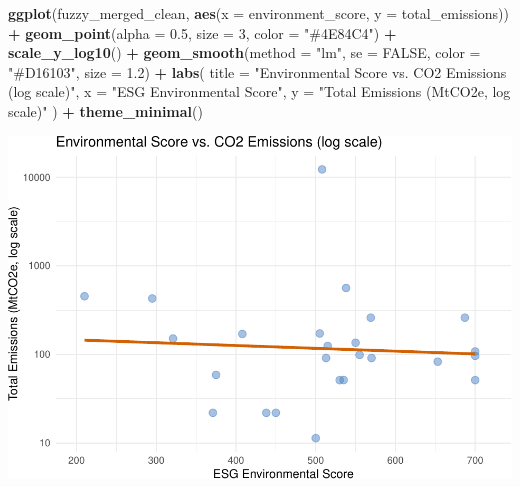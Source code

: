 \documentclass[
]{article}
\newenvironment{Shaded}{\begin{snugshade}}{\end{snugshade}}
\newcommand{\AttributeTok}[1]{\textcolor[rgb]{0.13,0.29,0.53}{#1}}
\newcommand{\ConstantTok}[1]{\textcolor[rgb]{0.56,0.35,0.01}{#1}}
\newcommand{\DecValTok}[1]{\textcolor[rgb]{0.00,0.00,0.81}{#1}}
\newcommand{\FloatTok}[1]{\textcolor[rgb]{0.00,0.00,0.81}{#1}}
\newcommand{\FunctionTok}[1]{\textcolor[rgb]{0.13,0.29,0.53}{\textbf{#1}}}
\newcommand{\NormalTok}[1]{#1}
\newcommand{\SpecialCharTok}[1]{\textcolor[rgb]{0.81,0.36,0.00}{\textbf{#1}}}
\newcommand{\StringTok}[1]{\textcolor[rgb]{0.31,0.60,0.02}{#1}}
\begin{document}
\begin{Shaded}
\begin{Highlighting}[]
\FunctionTok{ggplot}\NormalTok{(fuzzy\_merged\_clean, }\FunctionTok{aes}\NormalTok{(}\AttributeTok{x =}\NormalTok{ environment\_score, }\AttributeTok{y =}\NormalTok{ total\_emissions)) }\SpecialCharTok{+}
  \FunctionTok{geom\_point}\NormalTok{(}\AttributeTok{alpha =} \FloatTok{0.5}\NormalTok{, }\AttributeTok{size =} \DecValTok{3}\NormalTok{, }\AttributeTok{color =} \StringTok{"\#4E84C4"}\NormalTok{) }\SpecialCharTok{+}
  \FunctionTok{scale\_y\_log10}\NormalTok{() }\SpecialCharTok{+}
  \FunctionTok{geom\_smooth}\NormalTok{(}\AttributeTok{method =} \StringTok{"lm"}\NormalTok{, }\AttributeTok{se =} \ConstantTok{FALSE}\NormalTok{, }\AttributeTok{color =} \StringTok{"\#D16103"}\NormalTok{, }\AttributeTok{size =} \FloatTok{1.2}\NormalTok{) }\SpecialCharTok{+}
  \FunctionTok{labs}\NormalTok{(}
    \AttributeTok{title =} \StringTok{"Environmental Score vs. CO2 Emissions (log scale)"}\NormalTok{,}
    \AttributeTok{x =} \StringTok{"ESG Environmental Score"}\NormalTok{,}
    \AttributeTok{y =} \StringTok{"Total Emissions (MtCO2e, log scale)"}
\NormalTok{  ) }\SpecialCharTok{+}
  \FunctionTok{theme\_minimal}\NormalTok{()}
\end{Highlighting}
\end{Shaded}

\includegraphics{ESG-code_files/figure-latex/esg-vs-emissions-plot-1.pdf}
\end{document}
